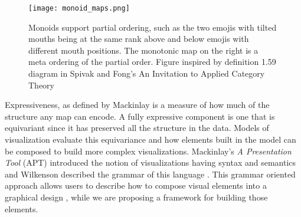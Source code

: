 \begin{figure}[tb]
    \centering %
    \texttt{[image: monoid\_maps.png]}
    \caption{Monoids support partial ordering, such as the two emojis with tilted mouths being at the same rank above and below emojis with different mouth positions. The monotonic map on the right is a meta ordering of the partial order.  Figure inspired by definition 1.59 diagram in Spivak and Fong's An Invitation to Applied Category Theory \cite{fongInvitationAppliedCategory2019}}
    \label{fig:data_partial_order}
  \end{figure}
  




  Expressiveness, as defined by Mackinlay \cite{mackinlayAUTOMATICDESIGNGRAPHICAL1987, mackinlayAutomatingDesignGraphical1986} is a measure of how much of the structure any map can encode. A fully expressive component is one that is equivariant since it has preserved all the structure in the data. Models of visualization evaluate this equivariance and how elements built in the model can be composed to build more complex visualizations. Mackinlay's \textit{A Presentation Tool} (APT) introduced the notion of visualizations having syntax and semantics \cite{mackinlayAutomatingDesignGraphical1986} and Wilkenson described the grammar of this language \cite{wilkinsonGrammarGraphics2005}. This grammar oriented approach allows users to describe how to compose visual elements into a graphical design \cite{wongsuphasawatNavigatingWideWorld2021}, while we are proposing a framework for building those elements. 
  

  
  
  